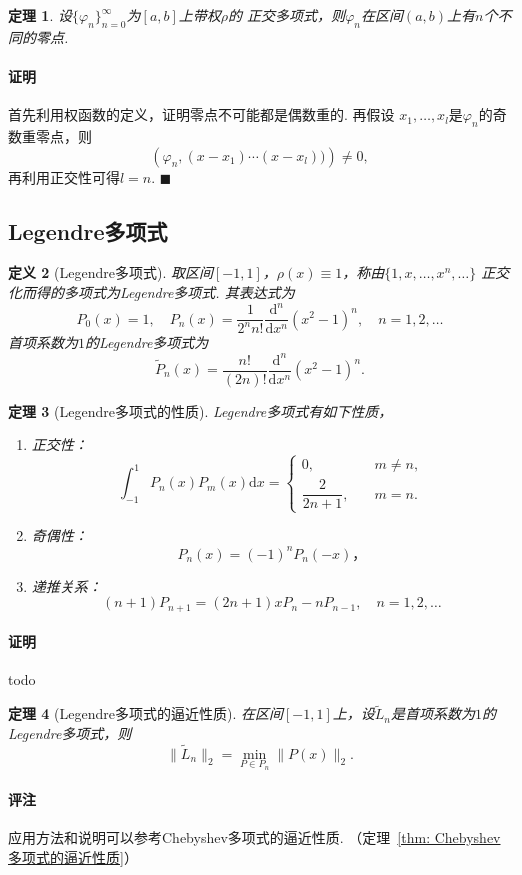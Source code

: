 \documentclass[12pt, a4paper]{article}
\theoremstyle{margin}
\newtheorem{thm}{定理}
\newtheorem{defi}[thm]{定义}
\newcommand{\rd}{\mathrm{d}}
\newcommand\thmref[1]{定理~\ref{#1}}
\newcommand{\remark}{\paragraph{评注}}
\newcommand{\proof}{\paragraph{证明}}
\begin{document}
  \begin{thm}
    设$\{\varphi_n\}_{n=0}^\infty$为$[a, b]$上带权$\rho$的
    正交多项式，则$\varphi_n$在区间$(a, b)$上有$n$个不同的零点.
  \end{thm}
  \proof
    首先利用权函数的定义，证明零点不可能都是偶数重的. 再假设
    $x_1,\dots,x_l$是$\varphi_n$的奇数重零点，则
    \[
      \left(\varphi_n, (x-x_1)\cdots(x-x_l)) \right) \ne 0,
    \]
    再利用正交性可得$l=n$. $\blacksquare$

\newpage
\subsection{Legendre多项式}
  \begin{defi}[Legendre多项式]
    取区间$[-1, 1]$，$\rho(x)\equiv1$，称由$\{1,x,\dots,x^n,\dots\}$
    正交化而得的多项式为Legendre多项式. 其表达式为
    \[
      P_0(x) = 1,\quad
      P_n(x) = \frac{1}{2^nn!}\frac{\rd^n}{\rd x^n}(x^2-1)^n,
      \quad n=1,2,\dots
    \]
    首项系数为$1$的Legendre多项式为
    \[
      \widetilde{P}_n(x) = \frac{n!}{(2n)!}\frac{\rd^n}{\rd x^n}(x^2-1)^n.
    \]
  \end{defi}

  \begin{thm}[Legendre多项式的性质]
    Legendre多项式有如下性质，
    \begin{enumerate}
      \item 正交性：
      \[
        \int_{-1}^1 P_n(x)P_m(x)\rd x =
        \begin{cases}
            0, &\quad m\ne n, \\
            \dfrac{2}{2n+1},&\quad m = n.
        \end{cases}
      \]
      \item 奇偶性：
        \[P_n(x) = (-1)^nP_n(-x)，\]
      \item 递推关系：
      \[
        (n+1)P_{n+1} = (2n+1)xP_n - nP_{n-1},\quad
        n = 1, 2,\dots
      \]
    \end{enumerate}
  \end{thm}
  \proof todo

  \begin{thm}[Legendre多项式的逼近性质]
    \label{thm: Legendre多项式的逼近性质}
    在区间$[-1, 1]$上，设$\widetilde{L}_n$是首项系数为$1$的
    Legendre多项式，则
    \[
      \|\widetilde{L}_n\|_2 = \min_{P\in P_n}\|P(x)\|_2.
    \]
  \end{thm}
  \remark
    应用方法和说明可以参考Chebyshev多项式的逼近性质.
    （\thmref{thm: Chebyshev多项式的逼近性质}）
\end{document}
